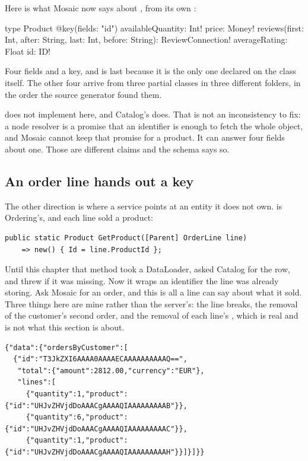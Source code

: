 Here is what Mosaic now says about , from its own
:

\begin{graphqlsdl}
type Product @key(fields: "id") {
  availableQuantity: Int!
  price: Money!
  reviews(first: Int, after: String, last: Int, before: String): ReviewConnection!
  averageRating: Float
  id: ID!
}
\end{graphqlsdl}

Four fields and a key, and  is last because it is the only one declared
on the class itself. The other four arrive from three
 partial classes in three different folders, in the
order the source generator found them.

 does not implement  here, and Catalog's does. That is
not an inconsistency to fix: a node resolver is a promise that an identifier is
enough to fetch the whole object, and Mosaic cannot keep that promise for a
product. It can answer four fields about one. Those are different claims and the
schema says so.

\subsection*{An order line hands out a key}

%
The other direction is where a service points at an entity it does not own.
 is Ordering's, and each line sold a product:

\begin{verbatim}
public static Product GetProduct([Parent] OrderLine line)
    => new() { Id = line.ProductId };
\end{verbatim}

Until this chapter that method took a DataLoader, asked Catalog for the row, and
threw if it was missing. Now it wraps an identifier the line was already
storing. Ask Mosaic for an order, and this is all a line can say about what it
sold. Three things here are mine rather than the server's: the line breaks, the
removal of the customer's second order, and the removal of each line's
, which is real and is not what this section is about.

\begin{verbatim}
{"data":{"ordersByCustomer":[
  {"id":"T3JkZXI6AAAA0AAAAECAAAAAAAAAAQ==",
   "total":{"amount":2812.00,"currency":"EUR"},
   "lines":[
     {"quantity":1,"product":{"id":"UHJvZHVjdDoAAACgAAAAQIAAAAAAAAAB"}},
     {"quantity":6,"product":{"id":"UHJvZHVjdDoAAACgAAAAQIAAAAAAAAAC"}},
     {"quantity":1,"product":{"id":"UHJvZHVjdDoAAACgAAAAQIAAAAAAAAAH"}}]}]}}
\end{verbatim}

